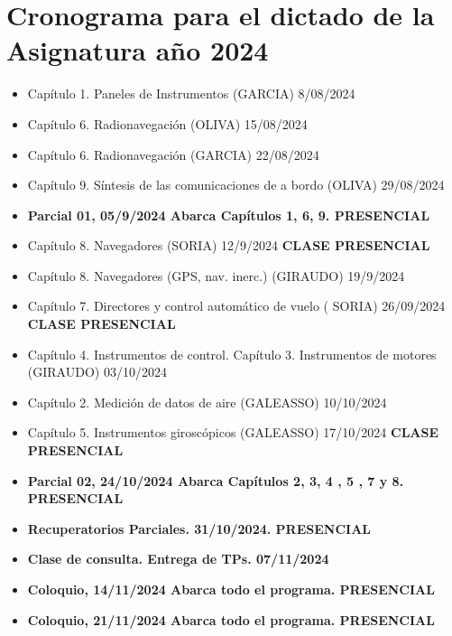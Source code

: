 \section*{Cronograma para el dictado de la Asignatura a\~no 2024}
\label{sec:00.cronograma}

  \begin{itemize}
  \item Capítulo 1. Paneles de Instrumentos (GARCIA) 8/08/2024
  \item Capítulo 6. Radionavegación (OLIVA) 15/08/2024
  \item Capítulo 6. Radionavegación (GARCIA) 22/08/2024    
  \item Capítulo 9. Síntesis de las comunicaciones de a bordo (OLIVA)     29/08/2024
  \item \textbf{Parcial 01,  05/9/2024 Abarca Capítulos 1, 6, 9.  PRESENCIAL}

  \item Capítulo 8. Navegadores (SORIA) 12/9/2024 {\bf CLASE PRESENCIAL}
  \item Capítulo 8. Navegadores (GPS, nav. inerc.) (GIRAUDO) 19/9/2024    
    
  \item Capítulo 7. Directores y control automático de vuelo ( SORIA) 26/09/2024  {\bf CLASE PRESENCIAL}
  
    \item Capítulo 4. Instrumentos de control. 
          Capítulo 3. Instrumentos de motores (GIRAUDO) 03/10/2024
  
  \item Capítulo 2. Medición de datos de aire (GALEASSO) 10/10/2024
  \item Capítulo 5. Instrumentos giroscópicos (GALEASSO) 17/10/2024   {\bf CLASE PRESENCIAL}

  \item {\bf Parcial 02,  24/10/2024 Abarca Capítulos 2, 3, 4 , 5 , 7 y 8. PRESENCIAL}

  \item \textbf{Recuperatorios Parciales.  31/10/2024. PRESENCIAL}

    
  \item {\bf Clase de consulta. Entrega de TPs. 07/11/2024 }

  \item \textbf{Coloquio,  14/11/2024 Abarca todo el programa. PRESENCIAL}
  \item \textbf{Coloquio, 21/11/2024 Abarca todo el programa. PRESENCIAL}
  \end{itemize}


